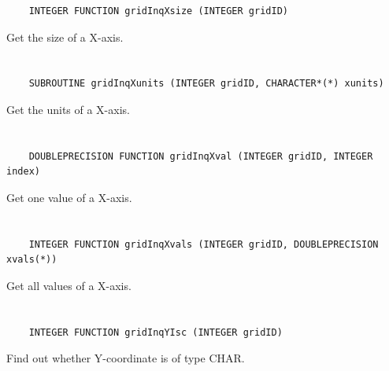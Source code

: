 \begin{verbatim}
    INTEGER FUNCTION gridInqXsize (INTEGER gridID)
\end{verbatim}

Get the size of a X-axis.


\section*{\tt {}}

\begin{verbatim}
    SUBROUTINE gridInqXunits (INTEGER gridID, CHARACTER*(*) xunits)
\end{verbatim}

Get the units of a X-axis.


\section*{\tt {}}

\begin{verbatim}
    DOUBLEPRECISION FUNCTION gridInqXval (INTEGER gridID, INTEGER index)
\end{verbatim}

Get one value of a X-axis.


\section*{\tt {}}

\begin{verbatim}
    INTEGER FUNCTION gridInqXvals (INTEGER gridID, DOUBLEPRECISION xvals(*))
\end{verbatim}

Get all values of a X-axis.


\section*{\tt {}}

\begin{verbatim}
    INTEGER FUNCTION gridInqYIsc (INTEGER gridID)
\end{verbatim}

Find out whether Y-coordinate is of type CHAR.


\section*{\tt {}}

